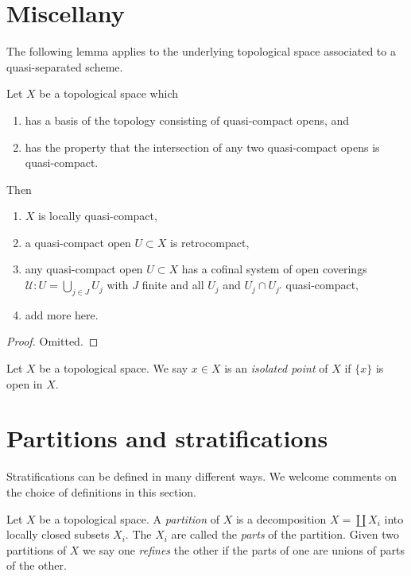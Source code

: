 \section{Miscellany}
\label{section-miscellany}


\noindent
The following lemma applies to the underlying topological space
associated to a quasi-separated scheme.

\begin{lemma}
\label{lemma-topology-quasi-separated-scheme}
Let $X$ be a topological space which
\begin{enumerate}
\item has a basis of the topology consisting of quasi-compact opens, and
\item has the property that the intersection of any two quasi-compact
opens is quasi-compact.
\end{enumerate}
Then
\begin{enumerate}
\item $X$ is locally quasi-compact,
\item a quasi-compact open $U \subset X$ is retrocompact,
\item any quasi-compact open $U \subset X$ has a cofinal system of open
coverings $\mathcal{U} : U = \bigcup_{j\in J} U_j$ with $J$ finite
and all $U_j$ and $U_j \cap U_{j'}$ quasi-compact,
\item add more here.
\end{enumerate}
\end{lemma}

\begin{proof}
Omitted.
\end{proof}

\begin{definition}
\label{definition-isolated-point}
Let $X$ be a topological space. We say $x \in X$ is an
{\it isolated point} of $X$ if $\{x\}$ is open in $X$.
\end{definition}



\section{Partitions and stratifications}
\label{section-stratifications}

\noindent
Stratifications can be defined in many different ways. We welcome
comments on the choice of definitions in this section.

\begin{definition}
\label{definition-paritition}
Let $X$ be a topological space. A {\it partition} of $X$ is a
decomposition $X = \coprod X_i$ into locally closed subsets $X_i$.
The $X_i$ are called the {\it parts} of the partition.
Given two partitions of $X$ we say one {\it refines} the other if
the parts of one are unions of parts of the other.
\end{definition}

